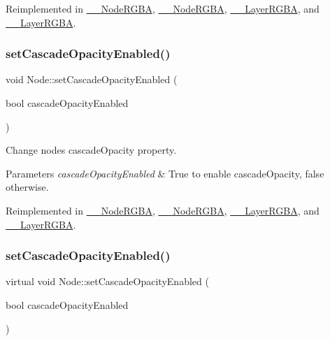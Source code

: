 Reimplemented in \hyperlink{class____NodeRGBA_a07c6d23e55cc2ba21115d2b93ef25bcd}{\+\_\+\+\_\+\+Node\+R\+G\+BA}, \hyperlink{class____NodeRGBA_a07c6d23e55cc2ba21115d2b93ef25bcd}{\+\_\+\+\_\+\+Node\+R\+G\+BA}, \hyperlink{class____LayerRGBA_a6559d3d54c2a7a8a35873390043b0aa6}{\+\_\+\+\_\+\+Layer\+R\+G\+BA}, and \hyperlink{class____LayerRGBA_a6559d3d54c2a7a8a35873390043b0aa6}{\+\_\+\+\_\+\+Layer\+R\+G\+BA}.

\mbox{\label{classNode_a56b08f1d19bb0345f6fb40d9a3e3b4a4}} 
\subsubsection{\texorpdfstring{set\+Cascade\+Opacity\+Enabled()}{setCascadeOpacityEnabled()}\hspace{0.1cm}{\footnotesize\ttfamily [1/2]}}
{\footnotesize\ttfamily void Node\+::set\+Cascade\+Opacity\+Enabled (\begin{DoxyParamCaption}\item[{bool}]{cascade\+Opacity\+Enabled }\end{DoxyParamCaption})\hspace{0.3cm}{\ttfamily [virtual]}}

Change node\textquotesingle{}s cascade\+Opacity property. 
\begin{DoxyParams}{Parameters}
{\em cascade\+Opacity\+Enabled} & True to enable cascade\+Opacity, false otherwise. \\
\hline
\end{DoxyParams}


Reimplemented in \hyperlink{class____NodeRGBA_a10fe85e705700fbe2bd28da1a17eda68}{\+\_\+\+\_\+\+Node\+R\+G\+BA}, \hyperlink{class____NodeRGBA_a10fe85e705700fbe2bd28da1a17eda68}{\+\_\+\+\_\+\+Node\+R\+G\+BA}, \hyperlink{class____LayerRGBA_ab25a8418f19d14a064f8c8072b3468a5}{\+\_\+\+\_\+\+Layer\+R\+G\+BA}, and \hyperlink{class____LayerRGBA_ab25a8418f19d14a064f8c8072b3468a5}{\+\_\+\+\_\+\+Layer\+R\+G\+BA}.

\mbox{\label{classNode_a9e36b274a6ee75f4931611b4c53f6180}} 
\subsubsection{\texorpdfstring{set\+Cascade\+Opacity\+Enabled()}{setCascadeOpacityEnabled()}\hspace{0.1cm}{\footnotesize\ttfamily [2/2]}}
{\footnotesize\ttfamily virtual void Node\+::set\+Cascade\+Opacity\+Enabled (\begin{DoxyParamCaption}\item[{bool}]{cascade\+Opacity\+Enabled }\end{DoxyParamCaption})\hspace{0.3cm}{\ttfamily [virtual]}}

